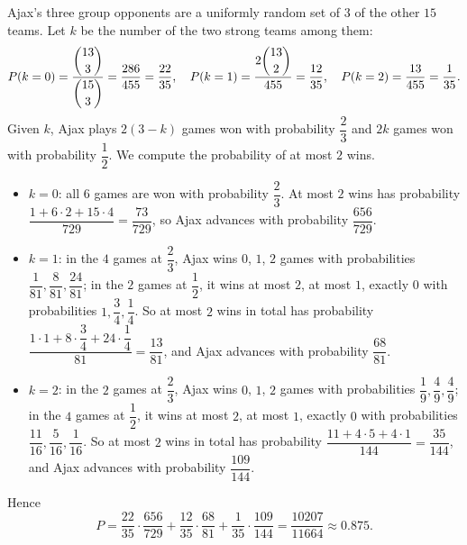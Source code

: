 Ajax's three group opponents are a uniformly random set of $3$ of the other $15$ teams. Let $k$ be the number of the two strong teams among them:
\[P(k=0)=\dfrac{\dbinom{13}3}{\dbinom{15}3}=\dfrac{286}{455}=\dfrac{22}{35},\quad P(k=1)=\dfrac{2\dbinom{13}2}{455}=\dfrac{12}{35},\quad P(k=2)=\dfrac{13}{455}=\dfrac1{35}.\]
Given $k$, Ajax plays $2(3-k)$ games won with probability $\dfrac23$ and $2k$ games won with probability $\dfrac12$. We compute the probability of at most $2$ wins.
\begin{itemize}
\item $k=0$: all $6$ games are won with probability $\dfrac23$. At most $2$ wins has probability $\dfrac{1+6\cdot2+15\cdot4}{729}=\dfrac{73}{729}$, so Ajax advances with probability $\dfrac{656}{729}$.
\item $k=1$: in the $4$ games at $\dfrac23$, Ajax wins $0$, $1$, $2$ games with probabilities $\dfrac1{81},\dfrac8{81},\dfrac{24}{81}$; in the $2$ games at $\dfrac12$, it wins at most $2$, at most $1$, exactly $0$ with probabilities $1,\dfrac34,\dfrac14$. So at most $2$ wins in total has probability $\dfrac{1\cdot1+8\cdot\dfrac34+24\cdot\dfrac14}{81}=\dfrac{13}{81}$, and Ajax advances with probability $\dfrac{68}{81}$.
\item $k=2$: in the $2$ games at $\dfrac23$, Ajax wins $0$, $1$, $2$ games with probabilities $\dfrac19,\dfrac49,\dfrac49$; in the $4$ games at $\dfrac12$, it wins at most $2$, at most $1$, exactly $0$ with probabilities $\dfrac{11}{16},\dfrac5{16},\dfrac1{16}$. So at most $2$ wins in total has probability $\dfrac{11+4\cdot5+4\cdot1}{144}=\dfrac{35}{144}$, and Ajax advances with probability $\dfrac{109}{144}$.
\end{itemize}
Hence
\[P=\dfrac{22}{35}\cdot\dfrac{656}{729}+\dfrac{12}{35}\cdot\dfrac{68}{81}+\dfrac1{35}\cdot\dfrac{109}{144}=\boxed{\dfrac{10207}{11664}}\approx0.875.\]
